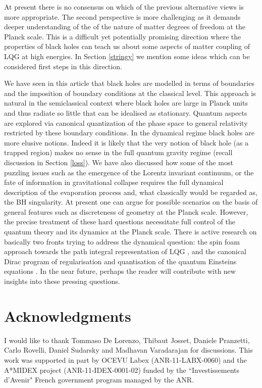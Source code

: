 \documentclass[aps, nofootinbib,superscriptaddress,12pt]{revtex4-2}
\begin{document}
At present there is no consensus on which of the previous alternative views is more appropriate.  
The second perspective is more challenging as it demands deeper understanding of the of the nature of matter degrees of freedom at the Planck scale. This is a difficult yet potentially promising direction where the properties of black holes can teach us about some aspects of matter coupling of LQG at high energies.  In Section \ref{stringy} we mention some ideas which can be considered first steps in this direction. 

We have seen in this article that black holes are modelled in terms of boundaries and the imposition of boundary conditions at the classical level. This approach is natural in the semiclassical context where black holes are large in Planck units and thus radiate so little that  can be idealised as stationary.  Quantum aspects are explored via canonical quantization of the phase space to general relativity restricted by these boundary conditions. 
In the dynamical regime black holes are more elusive notions. Indeed it is likely that the very notion of black hole (as a trapped region) makes no sense in the full quantum gravity regime (recall discussion in Section \ref{loss}). We have also discussed how  some of the most puzzling issues such as the emergence of the Lorentz invariant continuum, or the fate of information in gravitational collapse requires the full dynamical description of the evaporation process and, what classically would be regarded as, the BH singularity. At present one can argue for possible scenarios on the basis of general features such as discreteness of geometry at the Planck scale. However, the precise treatment of  these hard questions necessitate full control of the quantum theory and its dynamics at the Planck scale. There is active research on basically two fronts trying to address the dynamical question: the spin foam approach towards the path integral representation of LQG \cite{Perez:2012wv}, and the canonical Dirac program of regularisation and quantisation of the quantum Einsteins equations \cite{Laddha:2014xsa, Henderson:2012ie, Laddha:2011mk}. In the near future, perhaps the reader will contribute with new insights  into these pressing questions.

\section*{Acknowledgments}
I would like to thank Tommaso De Lorenzo, Thibaut Josset, Daniele Pranzetti, Carlo Rovelli, Daniel Sudarsky and Madhavan Varadarajan for discussions. 
This work was supported in part by 
OCEVU Labex (ANR-11-LABX-0060) and the A*MIDEX project (ANR-11-IDEX-0001-02) funded by the ``Investissements d'Avenir" French government program managed by the ANR.
\end{document}
